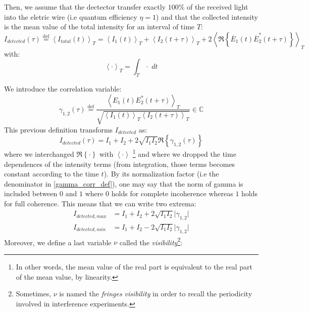 \documentclass[10pt]{report}
\begin{document}
Then, we assume that the dectector transfer exactly $100\% $ of the received light into the eletric wire (i.e quantum efficiency $\eta = 1$) and that the collected intensity is the mean value of the total intensity for an interval of time $T$:
\begin{equation}
I_{detected}(\tau) \stackrel{\text{def}}{=} \left\langle I_{total}(t) \right\rangle_T = \left\langle I_1(t) \right\rangle_T + \left\langle I_2(t + \tau) \right\rangle _T + 2\left\langle \Re\left\lbrace \overline{E}_1(t) \overline{E}_2^*(t + \tau)\right\rbrace \right\rangle _T
\end{equation}
with:
\begin{equation}
\left\langle \cdot \right\rangle _T = \int_T \cdot \,\,dt
\end{equation}

We introduce the correlation variable:
\begin{equation}
\label{gamma_corr_def}
\gamma_{1,2}(\tau) \stackrel{\text{def}}{=} \frac{\left\langle E_1(t) E_2^*(t + \tau) \right\rangle _T}{\sqrt{\left\langle I_1(t) \right\rangle_T \left\langle I_2(t + \tau) \right\rangle _T }} \in \mathbb{C}
\end{equation}
This previous definition transforms $I_{detected}$ as:
\begin{equation}
I_{detected}(\tau) = I_1 + I_2 + 2\sqrt{I_1 I_2} \Re \left\lbrace \gamma_{1,2}(\tau) \right\rbrace
\end{equation}
where we interchanged $\Re \left\lbrace \cdot \right\rbrace$ with $\left\langle \cdot \right \rangle$ \footnote{In other words, the mean value of the real part is equivalent to the real part of the mean value, by linearity.} and where we dropped the time dependences of the intensity terms (from integration, those terms becomes constant according to the time $t$).
By its normalization factor (i.e the denominator in \eqref{gamma_corr_def}), one may say that the norm of gamma is included between $0$ and $1$ where $0$ holds for complete incoherence whereas $1$ holds for full coherence. This means that we can write two extrema:
\begin{align}
I_{detected, max} &= I_1 + I_2 + 2\sqrt{I_1 I_2} \vert \gamma_{1,2} \vert\\
I_{detected, min} &= I_1 + I_2 - 2\sqrt{I_1 I_2} \vert \gamma_{1,2} \vert
\end{align}
Moreover, we define a last variable $\nu$ called the \textit{visibility}\footnote{Sometimes, $\nu$ is named the \textit{fringes visibility} in order to recall the periodicity involved in interference experiments.}:
\end{document}
